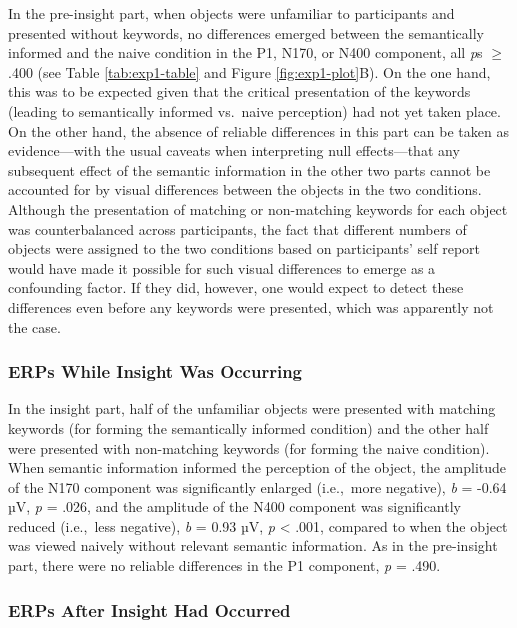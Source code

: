 \documentclass[
  english,
  man,floatsintext]{apa7}
\begin{document}
In the pre-insight part, when objects were unfamiliar to participants and presented without keywords, no differences emerged between the semantically informed and the naive condition in the P1, N170, or N400 component, all \emph{p}s \(\ge\) .400 (see Table \ref{tab:exp1-table} and Figure \ref{fig:exp1-plot}B). On the one hand, this was to be expected given that the critical presentation of the keywords (leading to semantically informed vs.~naive perception) had not yet taken place. On the other hand, the absence of reliable differences in this part can be taken as evidence---with the usual caveats when interpreting null effects---that any subsequent effect of the semantic information in the other two parts cannot be accounted for by visual differences between the objects in the two conditions. Although the presentation of matching or non-matching keywords for each object was counterbalanced across participants, the fact that different numbers of objects were assigned to the two conditions based on participants' self report would have made it possible for such visual differences to emerge as a confounding factor. If they did, however, one would expect to detect these differences even before any keywords were presented, which was apparently not the case.

\hypertarget{erps-while-insight-was-occurring}{%
\subsubsection{ERPs While Insight Was Occurring}\label{erps-while-insight-was-occurring}}

In the insight part, half of the unfamiliar objects were presented with matching keywords (for forming the semantically informed condition) and the other half were presented with non-matching keywords (for forming the naive condition). When semantic information informed the perception of the object, the amplitude of the N170 component was significantly enlarged (i.e.,~more negative), \emph{b} = -0.64 µV, \emph{p} = .026, and the amplitude of the N400 component was significantly reduced (i.e.,~less negative), \emph{b} = 0.93 µV, \emph{p} \textless{} .001, compared to when the object was viewed naively without relevant semantic information. As in the pre-insight part, there were no reliable differences in the P1 component, \emph{p} = .490.

\hypertarget{erps-after-insight-had-occurred}{%
\subsubsection{ERPs After Insight Had Occurred}\label{erps-after-insight-had-occurred}}
\end{document}
